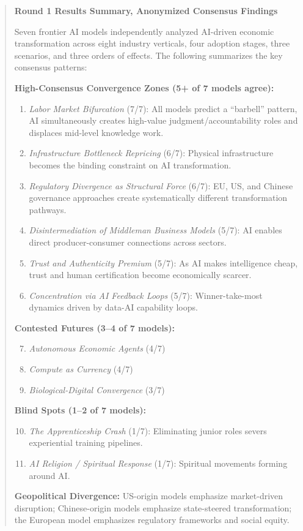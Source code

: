 \documentclass[preprint,review,12pt]{elsarticle}
\begin{document}
\begin{quote}
\textbf{Round 1 Results Summary, Anonymized Consensus Findings}

Seven frontier AI models independently analyzed AI-driven economic transformation across eight industry verticals, four adoption stages, three scenarios, and three orders of effects. The following summarizes the key consensus patterns:

\textbf{High-Consensus Convergence Zones (5+ of 7 models agree):}
\begin{enumerate}
 \item \textit{Labor Market Bifurcation} (7/7): All models predict a ``barbell'' pattern, AI simultaneously creates high-value judgment/accountability roles and displaces mid-level knowledge work.
 \item \textit{Infrastructure Bottleneck Repricing} (6/7): Physical infrastructure becomes the binding constraint on AI transformation.
 \item \textit{Regulatory Divergence as Structural Force} (6/7): EU, US, and Chinese governance approaches create systematically different transformation pathways.
 \item \textit{Disintermediation of Middleman Business Models} (5/7): AI enables direct producer-consumer connections across sectors.
 \item \textit{Trust and Authenticity Premium} (5/7): As AI makes intelligence cheap, trust and human certification become economically scarcer.
 \item \textit{Concentration via AI Feedback Loops} (5/7): Winner-take-most dynamics driven by data-AI capability loops.
\end{enumerate}

\textbf{Contested Futures (3--4 of 7 models):}
\begin{enumerate}
 \setcounter{enumi}{6}
 \item \textit{Autonomous Economic Agents} (4/7)
 \item \textit{Compute as Currency} (4/7)
 \item \textit{Biological-Digital Convergence} (3/7)
\end{enumerate}

\textbf{Blind Spots (1--2 of 7 models):}
\begin{enumerate}
 \setcounter{enumi}{9}
 \item \textit{The Apprenticeship Crash} (1/7): Eliminating junior roles severs experiential training pipelines.
 \item \textit{AI Religion / Spiritual Response} (1/7): Spiritual movements forming around AI.
\end{enumerate}

\textbf{Geopolitical Divergence:} US-origin models emphasize market-driven disruption; Chinese-origin models emphasize state-steered transformation; the European model emphasizes regulatory frameworks and social equity.
\end{quote}
\end{document}
